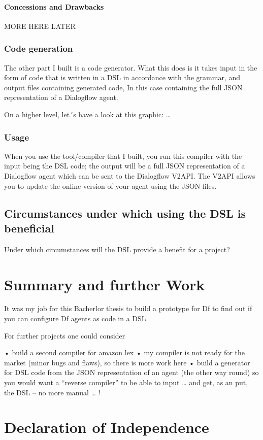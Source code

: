 \subsubsection{Concessions and Drawbacks}

MORE HERE LATER


\subsection{Code generation}

The other part I built is a code generator.
What this does is it takes input in the form of code that is written in a DSL in accordance with the grammar, and output files containing generated code,
In this case containing the full JSON representation of a Dialogflow agent.

On a higher level, let´s have a look at this graphic: …

\subsection{Usage}
When you use the tool/compiler that I built, you run this compiler with the input being the DSL code; the output will be a full JSON representation of a Dialogflow agent which can be sent to the Dialogflow V2API.
The V2API allows you to update the online version of your agent using the JSON files.

\section{Circumstances under which using the DSL is beneficial}
Under which circumstances will the DSL provide a benefit for a project?






\chapter{Summary and further Work}

It was my job for this Bacherlor thesis to build a prototype for Df to find out if you can configure Df agents as code in a DSL.

For further projects one could consider

•	build a second compiler for amazon lex
•	my compiler is not ready for the market (minor bugs and flaws), so there is more work here 
•	build a generator for DSL code from the JSON representation of an agent (the other way round) so you would want a “reverse compiler” to be able to input … and get, as an put, the DSL – no more manual … ! 

\chapter{Declaration of Independence}